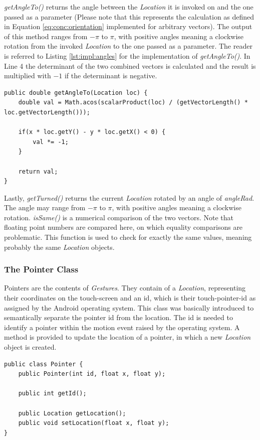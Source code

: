 \textit{getAngleTo()} returns the angle between the \textit{Location} it is invoked on and the one passed as a parameter  (Please note that this represents the calculation as defined in Equation \ref{eq:conc:orientation} implemented for arbitrary vectors). The output of this method ranges from $-\pi$ to $\pi$, with positive angles meaning a clockwise rotation from the invoked \textit{Location} to the one passed as a parameter. The reader is referred to Listing \ref{lst:impl:angles} for the implementation of \textit{getAngleTo()}. In Line 4 the determinant of the two combined vectors is calculated and the result is multiplied with $-1$ if the determinant is negative.

\begin{lstlisting}[caption={Implementation of getAngleTo()},label=lst:impl:angles]
public double getAngleTo(Location loc) {
	double val = Math.acos(scalarProduct(loc) / (getVectorLength() * loc.getVectorLength()));
	
	if(x * loc.getY() - y * loc.getX() < 0) {
		val *= -1;
	}

	return val;
}
\end{lstlisting}

Lastly, \textit{getTurned()} returns the current \textit{Location} rotated by an angle of \textit{angleRad}. The angle may range from $-\pi$ to $\pi$, with positive angles meaning a clockwise rotation. \textit{isSame()} is a numerical comparison of the two vectors. Note that floating point numbers are compared here, on which equality comparisons are problematic. This function is used to check for exactly the same values, meaning probably the same \textit{Location} objects.

\subsubsection{The Pointer Class}

Pointers are the contents of \textit{Gestures}. They contain of a \textit{Location}, representing their coordinates on the touch-screen and an id, which is their touch-pointer-id as assigned by the Android operating system. This class was basically introduced to semantically separate the pointer id from the location. The id is needed to identify a pointer within the motion event raised by the operating system. A method is provided to update the location of a pointer, in which a new \textit{Location} object is created.
\begin{lstlisting}[caption={The Pointer class}]
public class Pointer {
	public Pointer(int id, float x, float y);

	public int getId();

	public Location getLocation();
	public void setLocation(float x, float y);
}
\end{lstlisting}

